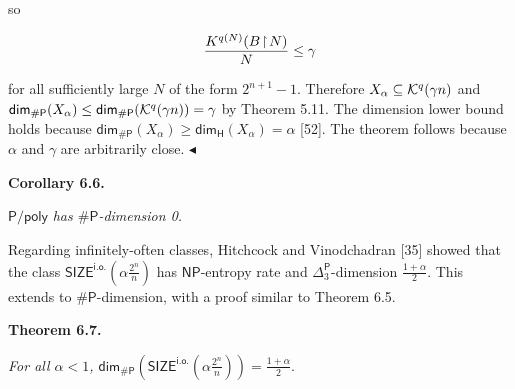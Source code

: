 so\par


\[\begin{gathered}
\frac{K^{q(N)}(B\negthinspace\upharpoonright\negthinspace N)}{N}\leq\gamma
\end{gathered}\]


for all sufficiently large $N$ of the form $2^{n+1}-1$. Therefore $X_{\alpha}\subseteq{\cal K}^{q}(\gamma n)$ and
${\mathsf{dim}}_{\mathsf{\#}\mathsf{P}}(X_{\alpha})\leq{\mathsf{dim}}_{\mathsf{\#}\mathsf{P}}({\cal K}^{q}(\gamma n))=\gamma$ by Theorem 5.11.
The dimension lower bound holds because ${\mathsf{dim}}_{\mathsf{\#}\mathsf{P}}(X_{\alpha})\allowbreak\geq{\mathsf{dim}}_{\mathsf{H}}(X_{\alpha})=\alpha$ [52]. The theorem follows because $\alpha$ and $\gamma$ are arbitrarily close.
$\blacktriangleleft$\par





\par\medskip\noindent\textbf{
\textbf{Corollary 6.6}\textbf{.}
}\par



${\mathsf{P}/\mathsf{poly}}$\emph{ has ${\mathsf{\#}\mathsf{P}}$-dimension 0.}\par






Regarding infinitely-often classes, Hitchcock and Vinodchadran [35] showed that the class
$\mathsf{SIZE}^{\mathsf{i.o.}}\!\!\left(\alpha\frac{2^{n}}{n}\right)$ has $\mathsf{NP}$-entropy rate and ${\Delta^{\mathsf{P}}_{3}}$-dimension $\frac{1+\alpha}{2}.$
This extends to ${\mathsf{\#}\mathsf{P}}$-dimension, with a proof similar to Theorem 6.5.\par





\par\medskip\noindent\textbf{
\textbf{Theorem 6.7}\textbf{.}
}\par



\emph{For all $\alpha<1$,
${\mathsf{dim}}_{{\mathsf{\#}\mathsf{P}}}\left(\mathsf{SIZE}^{\mathsf{i.o.}}\!\!\left(\alpha\frac{2^{n}}{n}\right)\right)=\frac{1+\alpha}{2}.$}\par



